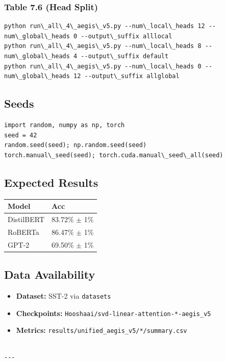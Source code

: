 \subsubsection{Table 7.6 (Head Split)}
\begin{lstlisting}
python run\_all\_4\_aegis\_v5.py --num\_local\_heads 12 --num\_global\_heads 0 --output\_suffix alllocal
python run\_all\_4\_aegis\_v5.py --num\_local\_heads 8 --num\_global\_heads 4 --output\_suffix default
python run\_all\_4\_aegis\_v5.py --num\_local\_heads 0 --num\_global\_heads 12 --output\_suffix allglobal
\end{lstlisting}

\subsection{Seeds}

\begin{lstlisting}
import random, numpy as np, torch
seed = 42
random.seed(seed); np.random.seed(seed)
torch.manual\_seed(seed); torch.cuda.manual\_seed\_all(seed)
\end{lstlisting}

\subsection{Expected Results}

\begin{table}[H]
\centering
\small
\begin{tabular}{ll}
\toprule
\textbf{Model} & \textbf{Acc} \\
\midrule
DistilBERT & 83.72\% $\pm$ 1\% \\
RoBERTa & 86.47\% $\pm$ 1\% \\
GPT-2 & 69.50\% $\pm$ 1\% \\
\bottomrule
\end{tabular}
\end{table}

\subsection{Data Availability}

\begin{itemize}
\item \textbf{Dataset:} SST-2 via \texttt{datasets}
\item \textbf{Checkpoints:} \texttt{Hooshaai/svd-linear-attention-*-aegis\_v5}
\item \textbf{Metrics:} \texttt{results/unified\_aegis\_v5/*/summary.csv}
\end{itemize}
\begin{lstlisting}

---
\end{lstlisting}